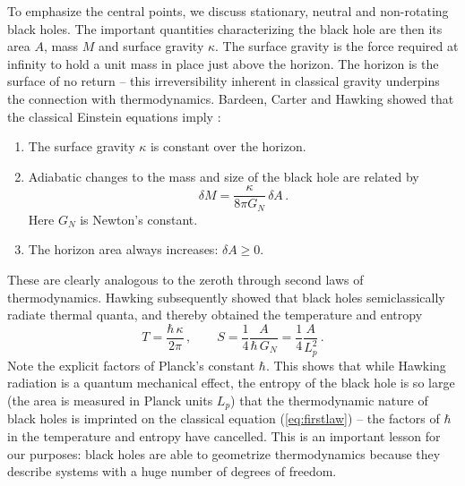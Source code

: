 \documentclass[10pt, oneside]{book}
\def\be{\begin{equation}}
\def\ee{\end{equation}}
\begin{document}
\begin{doublespace}
To emphasize the central points, we discuss stationary, neutral and non-rotating black holes. The important quantities characterizing the black hole are then its area $A$, mass $M$ and surface gravity $\kappa$. The surface gravity is the force required at infinity to hold a unit mass in place just above the horizon. The horizon is the surface of no return -- this irreversibility inherent in classical gravity underpins the connection with thermodynamics. Bardeen, Carter and Hawking showed that the classical Einstein equations imply \cite{Bardeen:1973gs}:
\begin{enumerate}
\item The surface gravity $\kappa$ is constant over the horizon.
\item Adiabatic changes to the mass and size of the black hole are related by
\be\label{eq:firstlaw}
\delta M = \frac{\kappa}{8 \pi G_N} \, \delta A \,.
\ee
Here $G_N$ is Newton's constant.
\item The horizon area always increases: $\delta A \geq 0$.
\end{enumerate}
These are clearly analogous to the zeroth through second laws of thermodynamics. Hawking subsequently showed that black holes semiclassically radiate thermal quanta, and thereby obtained the temperature and entropy \cite{Hawking:1974sw}
\be\label{eq:BH}
T = \frac{\hbar \, \kappa}{2 \pi} \,, \qquad S = \frac{1}{4} \frac{A}{\hbar \, G_N} = \frac{1}{4} \frac{A}{L_p^2} \,.
\ee
Note the explicit factors of Planck's constant $\hbar$. This shows that while Hawking radiation is a quantum mechanical effect, the entropy of the black hole is so large (the area is measured in Planck units $L_p$) that the thermodynamic nature of black holes is imprinted on the classical equation (\ref{eq:firstlaw}) -- the factors of $\hbar$ in the temperature and entropy have cancelled. This is an important lesson for our purposes: black holes are able to geometrize thermodynamics because they describe systems with a huge number of degrees of freedom.


\end{doublespace}
\end{document}
